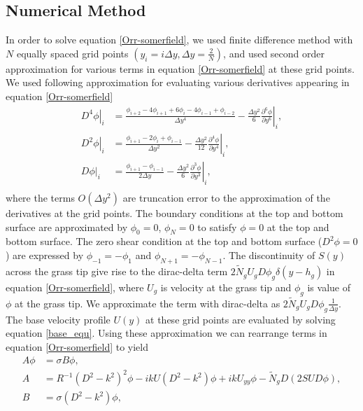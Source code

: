 \documentclass[12pt]{report}   %
\newcommand{\del}{\partial}
\newcommand{\Rey}{{R}}
\newcommand{\Ndg}{\tilde{N}_g}
\begin{document}
\subsection{Numerical Method}
  In order to solve equation \eqref{Orr-somerfield}, we used finite difference method with $N$ equally spaced grid points $(y_i = i\Delta y, \Delta y = \frac{2}{N})$, and used second order approximation for various terms in equation \eqref{Orr-somerfield} at these grid points. We used following approximation for evaluating various derivatives appearing in equation \eqref{Orr-somerfield}
  \begin{equation}
  \begin{align}
    \left.{ D^4\phi} \right|_i &= \frac{ \phi_{i+2}-4\phi_{i+1}+6\phi_{i}-4\phi_{i-1}+\phi_{i-2} }{\Delta y^4} - \frac{\Delta y^2}{6} \left. \frac{\del^6 \phi}{\del y^6} \right |_i, \\
    \left. D^2\phi \right|_i &=  \frac{\phi_{i+1} -2\phi_i +\phi_{i-1}}{\Delta y^2} - \left. \frac{\Delta y^2}{12} \frac{\del^4 \phi}{\del y^4} \right|_i ,\\    
    \left. D\phi \right|_i &=  \frac{\phi_{i+1} -\phi_{i-1}}{2\Delta y} - \left. \frac{\Delta y^2}{6} \frac{\del^3 \phi}{\del y^3} \right|_i, \\
    \end{align}
  \end{equation}
where the terms $O(\Delta y^2)$ are truncation error to the approximation of the derivatives at the grid points.
The boundary conditions at the top and bottom surface are approximated by $\phi_0 = 0$,  $\phi_{N} = 0$ to satisfy $\phi=0$ at the top and bottom surface.
The zero shear condition at the top and bottom surface ($D^2\phi=0$) are expressed by $\phi_{-1} = -\phi_{1}$ and $\phi_{N+1} = -\phi_{N-1}$. The discontinuity of $S(y)$ across the grass tip give rise to the dirac-delta term $2\Ndg U_g D\phi_g \delta(y-h_g)$ in equation \eqref{Orr-somerfield}, where $U_g$ is velocity at the grass tip and $\phi_g$ is value of $\phi$ at the grass tip. We approximate the term with dirac-delta as $2\Ndg U_g D\phi_{g} \frac{1}{\Delta y}$.
The base velocity profile $U(y)$ at these grid points are evaluated by solving equation \eqref{base_equ}. Using these approximation we can rearrange terms in equation \eqref{Orr-somerfield} to yield
\begin{equation}
\begin{split}
A\phi &= \sigma B \phi,\\
A &= \Rey^{-1}\left(D^2 -k^{2} \right)^2\phi-ikU \left(D^2-k^2\right)\phi + ik U_{yy}\phi -\Ndg D\left(2 S U D \phi\right),\\
B &= {\sigma} \left(D^2-k^2\right) \phi,
\end{split}
\end{equation}
\end{document}
